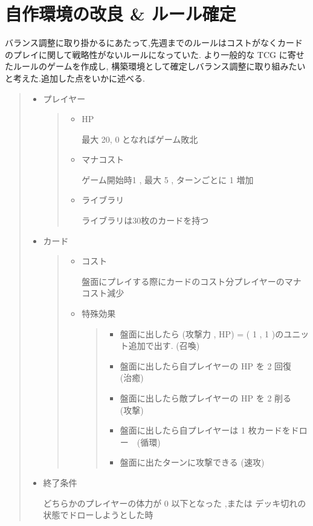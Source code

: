 \documentclass{jarticle}     %
\begin{document}
\section{自作環境の改良 \& ルール確定}
バランス調整に取り掛かるにあたって,先週までのルールはコストがなくカードのプレイに関して戦略性がないルールになっていた.
より一般的な TCG に寄せたルールのゲームを作成し, 構築環境として確定しバランス調整に取り組みたいと考えた.追加した点をいかに述べる.
\begin{quote}
  \begin{itemize}
   \item プレイヤー
   \par
   \begin{quote}
    \begin{itemize}
     \item HP
     \par
     最大 20, 0 となればゲーム敗北
     \item マナコスト
     \par
     ゲーム開始時1 , 最大 5 , ターンごとに 1 増加
     \item ライブラリ
     \par
     ライブラリは30枚のカードを持つ
    \end{itemize}
   \end{quote}
   \item カード
   \begin{quote}
    \begin{itemize}
     \item コスト
     \par
     盤面にプレイする際にカードのコスト分プレイヤーのマナコスト減少
     \item 特殊効果
     \par
     \begin{quote}
      \begin{itemize}
       \item 盤面に出したら (攻撃力 , HP) = ( 1 , 1 )のユニット追加で出す. (召喚)
       \item 盤面に出したら自プレイヤーの HP を 2 回復　(治癒)
       \item 盤面に出したら敵プレイヤーの HP を 2 削る　(攻撃)
       \item 盤面に出したら自プレイヤーは 1 枚カードをドロー　(循環)
       \item 盤面に出たターンに攻撃できる (速攻)
      \end{itemize}
     \end{quote}
    \end{itemize}
   \end{quote}
   \item 終了条件
   \par
   どちらかのプレイヤーの体力が 0 以下となった ,または デッキ切れの状態でドローしようとした時

  \end{itemize}
 \end{quote}
\end{document}
